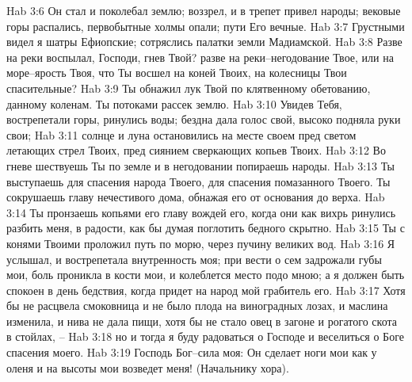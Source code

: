 Hab 3:6  Он стал и поколебал землю; воззрел, и в трепет привел народы; вековые горы распались, первобытные холмы опали; пути Его вечные.
Hab 3:7  Грустными видел я шатры Ефиопские; сотряслись палатки земли Мадиамской.
Hab 3:8  Разве на реки воспылал, Господи, гнев Твой? разве на реки--негодование Твое, или на море--ярость Твоя, что Ты восшел на коней Твоих, на колесницы Твои спасительные?
Hab 3:9  Ты обнажил лук Твой по клятвенному обетованию, данному коленам. Ты потоками рассек землю.
Hab 3:10  Увидев Тебя, вострепетали горы, ринулись воды; бездна дала голос свой, высоко подняла руки свои;
Hab 3:11  солнце и луна остановились на месте своем пред светом летающих стрел Твоих, пред сиянием сверкающих копьев Твоих.
Hab 3:12  Во гневе шествуешь Ты по земле и в негодовании попираешь народы.
Hab 3:13  Ты выступаешь для спасения народа Твоего, для спасения помазанного Твоего. Ты сокрушаешь главу нечестивого дома, обнажая его от основания до верха.
Hab 3:14  Ты пронзаешь копьями его главу вождей его, когда они как вихрь ринулись разбить меня, в радости, как бы думая поглотить бедного скрытно.
Hab 3:15  Ты с конями Твоими проложил путь по морю, через пучину великих вод.
Hab 3:16  Я услышал, и вострепетала внутренность моя; при вести о сем задрожали губы мои, боль проникла в кости мои, и колеблется место подо мною; а я должен быть спокоен в день бедствия, когда придет на народ мой грабитель его.
Hab 3:17  Хотя бы не расцвела смоковница и не было плода на виноградных лозах, и маслина изменила, и нива не дала пищи, хотя бы не стало овец в загоне и рогатого скота в стойлах, --
Hab 3:18  но и тогда я буду радоваться о Господе и веселиться о Боге спасения моего.
Hab 3:19  Господь Бог--сила моя: Он сделает ноги мои как у оленя и на высоты мои возведет меня! (Начальнику хора).


